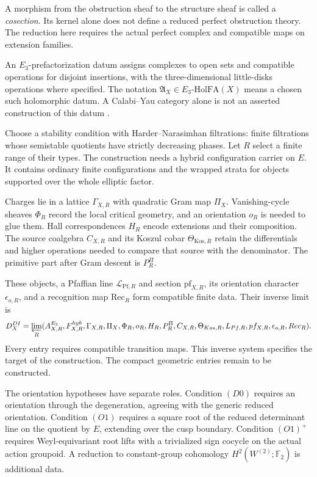 A morphism from the obstruction sheaf to the structure sheaf
is called a \emph{cosection}. Its kernel alone does not define a
reduced perfect obstruction theory. The reduction here requires
the actual perfect complex and compatible maps on extension families.

An \(E_3\)-prefactorization datum assigns complexes to open sets
and compatible operations for disjoint insertions, with the
three-dimensional little-disks operations where specified.
The notation
\(\mathfrak A_X\in E_3\text{-}\mathrm{HolFA}(X)\)
means a chosen such holomorphic datum. A Calabi--Yau category alone
is not an asserted construction of this datum
\cite{KontsevichOperadsMotives,TamarkinLittleDisks,
LambrechtsVolicLittleDisks,CostelloGwilliam1,CostelloGwilliam2}.

Choose a stability condition with Harder--Narasimhan filtrations:
finite filtrations whose semistable quotients have strictly decreasing
phases. Let \(R\) select a finite range of their types.
The construction needs a hybrid configuration carrier on \(E\).
It contains ordinary finite configurations and the wrapped strata
for objects supported over the whole elliptic factor.

Charges lie in a lattice \(\Gamma_{X,R}\) with quadratic Gram
map \(\Pi_X\). Vanishing-cycle sheaves \(\Phi_R\) record the
local critical geometry, and an orientation \(o_R\) is needed to
glue them. Hall correspondences \(H_R\) encode extensions and their
composition. The source coalgebra \(C_{X,R}\) and its Koszul cobar
\(\Theta_{\mathrm{Kos},R}\) retain the differentials and higher
operations needed to compare that source with the denominator.
The primitive part after Gram descent is \(P_R^\Pi\).

These objects, a Pfaffian line \(\mathcal L_{\mathrm{Pf},R}\)
and section \(\mathrm{pf}_{X,R}\), its orientation character
\(\epsilon_{o,R}\), and a recognition map \(\mathrm{Rec}_R\)
form compatible finite data. Their inverse limit is
\[
 \mathfrak D_X^{DI}=\varprojlim_R
 (\mathcal A^{E_3}_{X,R},F^{\mathrm{hyb}}_{X,R},\Gamma_{X,R},
 \Pi_X,\Phi_R,o_R,H_R,P_R^\Pi,C_{X,R},\Theta_{\mathrm{Kos},R},
 \mathcal L_{\mathrm{Pf},R},\mathrm{pf}_{X,R},
 \epsilon_{o,R},\mathrm{Rec}_R).
\]
Every entry requires compatible transition maps. This inverse
system specifies the target of the construction.
The compact geometric entries remain to be constructed.

The orientation hypotheses have separate roles. Condition \((D0)\)
requires an orientation through the degeneration, agreeing with the
generic reduced orientation. Condition \((O1)\) requires a square
root of the reduced determinant line on the quotient by \(E\),
extending over the cusp boundary. Condition \((O1)^+\) requires
Weyl-equivariant root lifts with a trivialized sign cocycle on
the actual action groupoid. A reduction to constant-group
cohomology \(H^2(W^{(2)};\mathbb F_2)\) is additional data.

